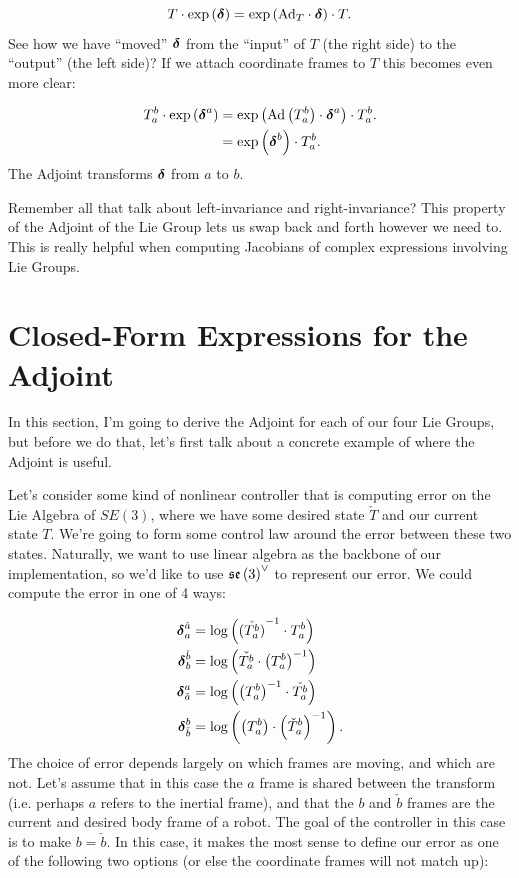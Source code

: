 \[
T\cdot\exp\left(\boldsymbol{\delta}\right)=\exp\left(\textnormal{Ad}_{T}\cdot\boldsymbol{\delta}\right)\cdot T.
\]
See how we have ``moved'' $\boldsymbol{\delta}$ from the ``input'' of $T$ (the
right side) to the ``output'' (the left side)? If we attach coordinate
frames to $T$ this becomes even more clear: 

\begin{align}
T_{a}^{b}\cdot\exp\left(\deltabf^{a}\right) & =\exp\left(\Ad\left(T_{a}^{b}\right)\cdot\deltabf^{a}\right)\cdot T_{a}^{b}.\nonumber \\
 & =\exp\left(\deltabf^{b}\right)\cdot T_{a}^{b}.\label{eq:adjoint_show}
\end{align}
The Adjoint transforms $\boldsymbol{\delta}$ from $a$ to $b.$

Remember all that talk about left-invariance and right-invariance?
This property of the Adjoint of the Lie Group lets us swap back and
forth however we need to. This is really helpful when computing Jacobians
of complex expressions involving Lie Groups.

\section{Closed-Form Expressions for the Adjoint}

In this section, I'm going to derive the Adjoint for each of our four
Lie Groups, but before we do that,\emph{ }let's first talk about a
concrete example of where the Adjoint is useful. 

Let's consider some kind of nonlinear controller that is computing
error on the Lie Algebra of $SE(3)$, where we have some
desired state $\check{T}$ and our current state $T.$ We're going
to form some control law around the error between these two states.
Naturally, we want to use linear algebra as the backbone of our implementation,
so we'd like to use $\mathfrak{se}\left(3\right)^{\vee}$ to represent our error.
We could compute the error in one of 4 ways:

\begin{align*}
\boldsymbol{\delta}_{a}^{\check{a}} & =\log\left(\check{\left(T_{a}^{b}\right)}^{-1}\cdot T_{a}^{b}\right)\\
\boldsymbol{\delta}_{b}^{\check{b}} & =\log\left(\check{T_{a}^{b}}\cdot\left(T_{a}^{b}\right)^{-1}\right)\\
\boldsymbol{\delta}_{\check{a}}^{a} & =\log\left(\left(T_{a}^{b}\right)^{-1}\cdot\check{T_{a}^{b}}\right)\\
\boldsymbol{\delta}_{\check{b}}^{b} & =\log\left(\left(T_{a}^{b}\right)\cdot\left(\check{T}_{a}^{b}\right)^{-1}\right).
\end{align*}
The choice of error depends largely on which frames are moving, and
which are not. Let's assume that in this case the $a$ frame is shared
between the transform (i.e. perhaps $a$ refers to the inertial frame),
and that the $b$ and $\check{b}$ frames are the current and desired
body frame of a robot. The goal of the controller in this case is
to make $b=\check{b}.$ In this case, it makes the most sense to define
our error as one of the following two options (or else the coordinate
frames will not match up):

